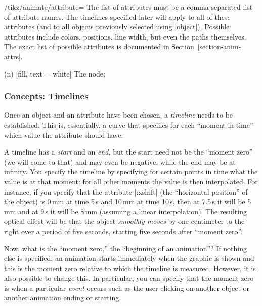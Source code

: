 \begin{key}{/tikz/animate/attribute=}
  The list of attributes must be a comma-separated list of attribute
  names. The timelines specified later will apply to all of these
  attributes (and to all objects previously selected using
  |object|). Possible attributes include colors, positions, line
  width, but even the paths themselves. The exact list of possible
  attributes is documented in Section~\ref{section-anim-attrs}.

\begin{codeexample}[animation list={0.5,1,1.5,2}]
\tikz [animate = {object = n, attribute = fill, 0s = "red", 2s = "blue",
                                                begin on = click }] 
  \node (n) [fill, text = white] {The node}; 
\end{codeexample}

\end{key}


\subsubsection{Concepts: Timelines}

Once an object and an attribute have been chosen, a \emph{timeline}
needs to be established. This is, essentially, a curve that specifies
for each ``moment in time'' which value the attribute should have.

A timeline has a \emph{start} and an \emph{end,} but the start need
not be the ``moment zero'' (we will come to that) and may even be
negative, while the end may be at infinity. You specify the timeline
by specifying for certain points in time what the value is at that
moment; for all other moments the value is then interpolated. For
instance, if you specify that the attribute |:xshift| (the
``horizontal position'' of the object) is 0\,mm at time 5\,s and 10\,mm
at time 10\,s, then at 7.5\,s it will be 5\,mm and at 9\,s it will
be 8\,mm (assuming a linear interpolation). The resulting optical
effect will be that the object \emph{smoothly moves} by one centimeter
to the right over a period of five seconds, starting five seconds
after ``moment zero''.

Now, what is the ``moment zero,'' the ``beginning of an animation''? If
nothing else is specified, an animation starts immediately when the
graphic is shown and this is the moment zero relative to which the
timeline is measured. However, it is also possible to change this. In
particular, you can specify that the moment zero is when a particular
\emph{event} occurs such as the user clicking on another object or
another animation ending or starting.

